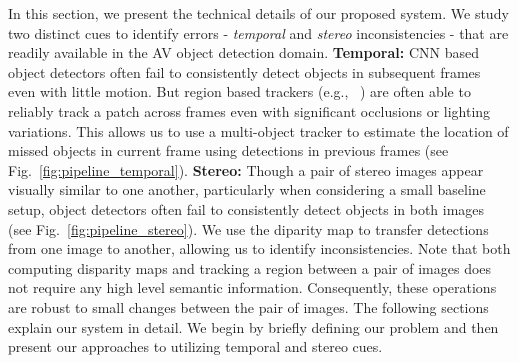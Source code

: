 \documentclass[letterpaper, 10 pt, journal, twoside]{IEEEtran}  %
\begin{document}
In this section, we present the technical details of our proposed system.
We study two distinct cues to identify errors - \emph{temporal} and \emph{stereo} inconsistencies - that are readily available in the AV object detection domain. 
\textbf{Temporal:} CNN based object detectors often fail to consistently detect objects in subsequent frames even with little motion. But region 
based trackers (e.g., ~\cite{kalal2012tracking}) are often able to reliably track a patch across frames even with significant occlusions or lighting variations.  
This allows us to use a multi-object tracker to estimate the location of missed objects in current frame using detections in previous frames (see Fig.~\ref{fig:pipeline_temporal}). 
\textbf{Stereo:} Though a pair of stereo images appear visually similar to one another, particularly when considering a small
baseline setup, object detectors often fail to consistently detect objects in both images (see Fig.~\ref{fig:pipeline_stereo}).
We use the diparity map to transfer detections from one image to another, allowing us to identify inconsistencies.
Note that both computing disparity maps and tracking a region between a pair of images does not require
any high level semantic information. Consequently, these operations are robust to small changes between the pair of images.
The following sections explain our system in detail. 
We begin by briefly defining our problem and then present our approaches to utilizing temporal and stereo cues.
\end{document}

